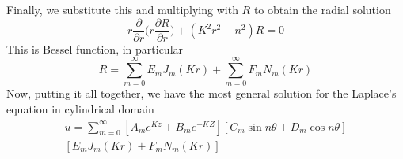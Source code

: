 \documentclass[../../../main.tex]{subfiles}
\begin{document}
Finally, we substitute this and multiplying with $R$ to obtain the radial solution
\begin{equation*}
    r\frac{\partial}{\partial r}\Biggl(r\frac{\partial R}{\partial r}\Biggr)
    +(K^2r^2-n^2)R=0
\end{equation*}
This is Bessel function, in particular
\begin{equation*}
    R=\sum_{m=0}^{\infty}E_mJ_m(Kr)+\sum_{m=0}^{\infty}F_mN_m(Kr)
\end{equation*}
Now, putting it all together, we have the most general solution for the Laplace's equation in cylindrical domain
\begin{multline*}
    u=\sum_{m=0}^{\infty}\left[A_me^{Kz}+B_me^{-KZ}\right]\left[C_m\sin n\theta +D_m\cos n\theta\right]\\
    \left[E_mJ_m(Kr)+F_mN_m(Kr)\right]
\end{multline*}
\end{document}
